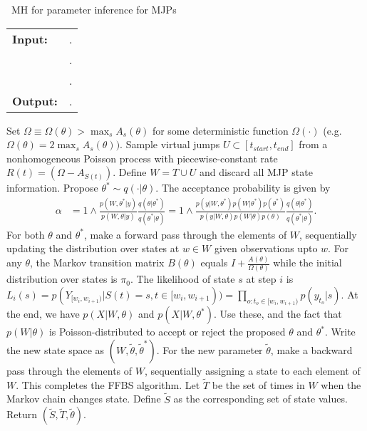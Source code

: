 \begin{algorithm}[H]
   \caption{\Naive\  MH for parameter inference for MJPs }
   \label{alg:MH_naive}
  \begin{tabular}{l l}
   \textbf{Input:  } & \text{A set of partial and noisy observations $X$}. \\
                      & \text{The previous MJP path $S(t) = (S, T)$, the previous MJP parameters $\theta$}.\\ 
                     & \text{A  Metropolis-Hasting proposal $q(\cdot | \theta)$}.\\
   \textbf{Output:  }& \text{A new MJP trajectory $\tilde{S} (t) = (\tilde{S}, \tilde{T})$, 
                            new MJP parameters $\tilde{\theta}$}.\\
   \hline
   \end{tabular}
   \begin{algorithmic}[1]
     \State Set $\Omega \equiv \Omega(\theta) > \max_s{A_s(\theta)}$ for
     some deterministic function $\Omega(\cdot)$ (e.g.\ $\Omega(\theta) = 
      2\max_s A_s(\theta))$.
      \State Sample virtual jumps $U\subset[t_{start}, t_{end}]$ from a 
      nonhomogeneous Poisson process with piecewise-constant rate 
      $R(t) = (\Omega - A_{S(t)})$. 
    Define $W = T \cup U$ and discard all MJP state information.
      \State Propose $\theta^* \sim q(\cdot| \theta)$.
          The acceptance probability is given by 
          \begin{align*}
          \alpha &=  1 \wedge \frac{p(W,\theta^*| y)}{p(W, \theta| y)} \frac{q(\theta|\theta^*)}{q(\theta^*|\theta)}
          =  1 \wedge \frac{p(y| W,\theta^*) p(W | \theta^*)p(\theta^*)}{p(y|W, \theta)p(W | \theta)p(\theta)} \frac{q(\theta|\theta^*)}{q(\theta^*|\theta)}.
          \end{align*}
    \State For both $\theta$ and $\theta^*$, make a forward pass through the 
    elements of $W$, sequentially updating the distribution over states at 
    $w \in W$ given observations upto $w$. 
    For any $\theta$, the Markov transition matrix 
    $B(\theta)$ equals $I + \frac{A(\theta)}{\Omega(\theta)}$ while the initial distribution
      over states is $\pi_0$. The likelihood of state $s$ at step $i$ is 
      $ L_i(s) = p(Y_{[w_i, w_{i + 1})} | S(t) = s , t \in [w_i, w_{i + 1})) = 
      \prod_{o: t_o \in [w_i, w_{i + 1})}p(y_{t_o} | s)$.
    At the end, we have 
    $p(X|W,\theta)$ and $p(X|W,\theta^*)$. Use these, and the fact that 
    $p(W|\theta)$ is Poisson-distributed to accept or reject the
    proposed $\theta$ and $\theta^*$. Write the new state space
    as $(W,\tilde{\theta},\tilde{\theta}^*)$.
    \State For the new parameter $\tilde{\theta}$, make a backward pass through 
    the elements of
    $W$, sequentially assigning a state to each element of $W$. This
    completes the FFBS algorithm.
    \State Let $\tilde{T}$ be the set of times in $W$ when the Markov chain changes state. Define $\tilde{S}$ as the corresponding set of state values. Return $(\tilde{S}, \tilde{T}, \tilde{\theta})$.
\end{algorithmic}
\end{algorithm}
